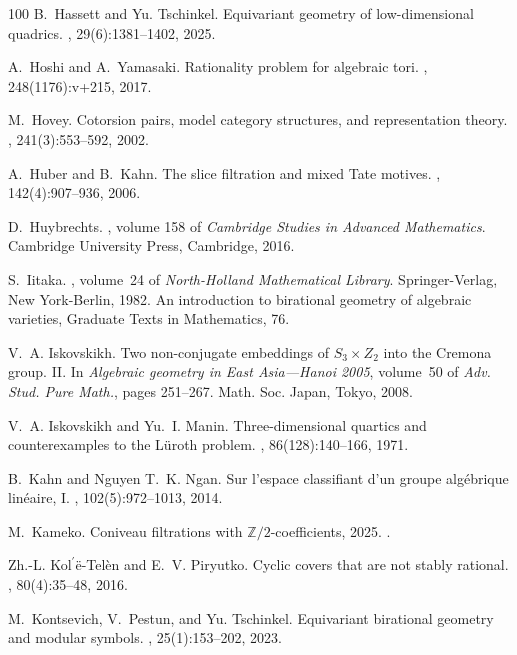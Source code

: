 \documentclass[12pt,reqno]{amsart}
\theoremstyle{plain}
\theoremstyle{remark}
\theoremstyle{definition}
\numberwithin{equation}{section}
\newcommand{\bZ}{{\mathbb Z}}
\begin{document}
\begin{thebibliography}{100}
B.~Hassett and Yu. Tschinkel.
\newblock Equivariant geometry of low-dimensional quadrics.
, 29(6):1381--1402, 2025.

A.~Hoshi and A.~Yamasaki.
\newblock Rationality problem for algebraic tori.
, 248(1176):v+215, 2017.

M.~Hovey.
\newblock Cotorsion pairs, model category structures, and representation
  theory.
, 241(3):553--592, 2002.

A.~Huber and B.~Kahn.
\newblock The slice filtration and mixed {T}ate motives.
, 142(4):907--936, 2006.

D.~Huybrechts.
, volume 158 of {\em Cambridge Studies
  in Advanced Mathematics}.
\newblock Cambridge University Press, Cambridge, 2016.

S.~Iitaka.
, volume~24 of {\em North-Holland
  Mathematical Library}.
\newblock Springer-Verlag, New York-Berlin, 1982.
\newblock An introduction to birational geometry of algebraic varieties,
  Graduate Texts in Mathematics, 76.

V.~A. Iskovskikh.
\newblock Two non-conjugate embeddings of {$S_3\times Z_2$} into the {C}remona
  group. {II}.
\newblock In {\em Algebraic geometry in {E}ast {A}sia---{H}anoi 2005},
  volume~50 of {\em Adv. Stud. Pure Math.}, pages 251--267. Math. Soc. Japan,
  Tokyo, 2008.

V.~A. Iskovskikh and Yu.~I. Manin.
\newblock Three-dimensional quartics and counterexamples to the {L}\"uroth
  problem.
, 86(128):140--166, 1971.

B.~Kahn and Nguyen T.~K. Ngan.
\newblock Sur l'espace classifiant d'un groupe alg\'{e}brique lin\'{e}aire,
  {I}.
, 102(5):972--1013, 2014.

M.~Kameko.
\newblock Coniveau filtrations with {$\bZ/2$}-coefficients, 2025.
.

Zh.-L. Ko{$\mathrm{l}^\prime$}\"e-Tel\`en and E.~V. Piryutko.
\newblock Cyclic covers that are not stably rational.
, 80(4):35--48, 2016.

M.~Kontsevich, V.~Pestun, and Yu. Tschinkel.
\newblock Equivariant birational geometry and modular symbols.
, 25(1):153--202, 2023.


\end{thebibliography}
\end{document}
